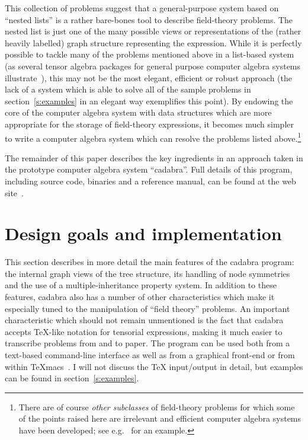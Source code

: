 \documentclass{elsart}
\begin{document}
This collection of problems suggest that a general-purpose system
based on ``nested lists'' is a rather bare-bones tool to describe
field-theory problems. The nested list is just one of the many
possible views or representations of the (rather heavily labelled)
graph structure representing the expression.  While it is perfectly
possible to tackle many of the problems mentioned above in a
list-based system (as several tensor algebra packages for general
purpose computer algebra systems
illustrate~\cite{e_xact,e_balf1,Klioner:1997sv,parker1}), this may not
be the most elegant, efficient or robust approach (the lack of a
system which is able to solve all of the sample problems in
section~\ref{s:examples} in an elegant way exemplifies this point). By
endowing the core of the computer algebra system with data structures
which are more appropriate for the storage of field-theory
expressions, it becomes much simpler to write a computer algebra
system which can resolve the problems listed above.\footnote{There are
of course \emph{other subclasses} of field-theory problems for which
some of the points raised here are irrelevant and efficient computer
algebra systems have been developed; see e.g.~\cite{Vermaseren:2000nd}
for an example.}

The remainder of this paper describes the key ingredients in an
approach taken in the prototype computer algebra system ``cadabra''.
Full details of this program, including source code, binaries and a
reference manual, can be found at the web site~\cite{kas_cdb}.


\section{Design goals and implementation}
\label{s:structure}

This section describes in more detail the main features of the cadabra
program: the internal graph views of the tree structure, its handling
of node symmetries and the use of a multiple-inheritance property
system.  In addition to these features, cadabra also has a number of
other characteristics which make it especially tuned to the
manipulation of ``field theory'' problems.  An important
characteristic which should not remain unmentioned is the fact that
cadabra accepts \TeX{}-like notation for tensorial expressions,
making it much easier to transcribe problems from and to paper. The
program can be used both from a text-based command-line interface as
well as from a graphical front-end or from within
\TeX{}macs~\cite{vdH:Gut}. I will not discuss the \TeX{} input/output
in detail, but examples can be found in section~\ref{s:examples}.
\end{document}
